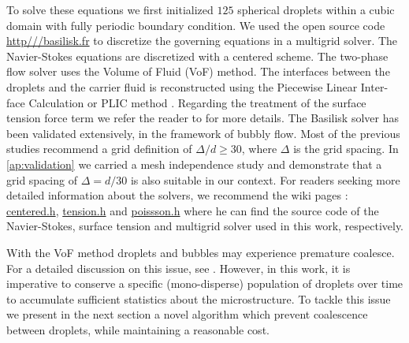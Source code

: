 To solve these equations we first initialized $125$ spherical droplets within a cubic domain with fully periodic boundary condition. 
We used the open source code \url{http///basilisk.fr} to discretize the governing equations in a multigrid solver. 
The Navier-Stokes equations are discretized with a centered scheme.
The two-phase flow solver uses the Volume of Fluid (VoF) method. 
The interfaces between the droplets and the carrier fluid is reconstructed using the Piecewise Linear Inter-face Calculation or PLIC method \citet[Chapter 5.]{tryggvason2011direct}.
Regarding the treatment of the surface tension force term we refer the reader to \citet{popinet2018numerical} for more details. 
The Basilisk solver has been validated extensively, in the framework of bubbly flow. 
Most of the previous studies \citep{hidman2023assessing,innocenti2020direct} recommend a grid definition of $\Delta/d \ge  30$, where $\Delta$ is the grid spacing. 
In \ref{ap:validation} we carried a mesh independence study and demonstrate that a grid spacing of $\Delta = d/30$ is also suitable in our context.
For readers seeking more detailed information about the solvers, we recommend the wiki pages : \href{http://basilisk.fr/src/navier-stokes/centered.h}{centered.h}, \href{http://basilisk.fr/src/tension.h}{tension.h} and \href{http://basilisk.fr/src/poissson.h}{poissson.h} where he can find the source code of the Navier-Stokes, surface tension and multigrid solver used in this work, respectively. 

With the VoF method droplets and bubbles may experience premature coalesce.
For a detailed discussion on this issue, see  \citet[Appendix B]{innocenti2020direct}.
However, in this work, it is imperative to conserve a specific (mono-disperse) population of droplets over time to accumulate sufficient statistics about the microstructure.
To tackle this issue we present in the next section a novel algorithm which prevent coalescence between droplets, while maintaining a reasonable cost. 





